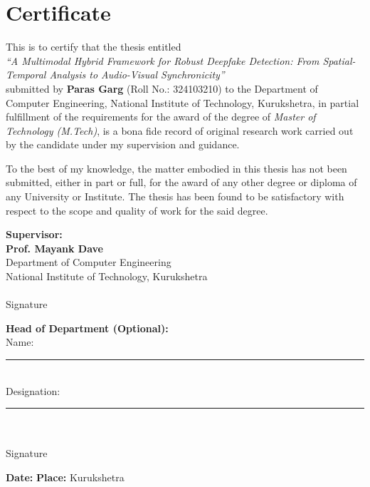 \chapter*{Certificate}
\thispagestyle{empty}
This is to certify that the thesis entitled\\
\textit{``A Multimodal Hybrid Framework for Robust Deepfake Detection: From Spatial-Temporal Analysis to Audio-Visual Synchronicity''}\\
submitted by \textbf{Paras Garg} (Roll No.: 324103210) to the Department of Computer Engineering, National Institute of Technology, Kurukshetra, in partial fulfillment of the requirements for the award of the degree of \textit{Master of Technology (M.Tech)}, is a bona fide record of original research work carried out by the candidate under my supervision and guidance.

To the best of my knowledge, the matter embodied in this thesis has not been submitted, either in part or full, for the award of any other degree or diploma of any University or Institute. The thesis has been found to be satisfactory with respect to the scope and quality of work for the said degree.

\vspace{1.5cm}
\noindent
\begin{minipage}[t]{0.45\textwidth}
\textbf{Supervisor:}\\[0.8cm]
\textbf{Prof. Mayank Dave}\\
Department of Computer Engineering\\
National Institute of Technology, Kurukshetra\\[1.2cm]
\makebox[0.9\linewidth]{\hrulefill}\\
Signature
\end{minipage}
\hfill
\begin{minipage}[t]{0.45\textwidth}
\textbf{Head of Department (Optional):}\\[0.8cm]
Name: \rule{5cm}{0.2pt}\\
Designation: \rule{4.5cm}{0.2pt}\\[1.2cm]
\makebox[0.9\linewidth]{\hrulefill}\\
Signature
\end{minipage}

\vspace{1.5cm}
\noindent\textbf{Date:} \hspace{4cm} \textbf{Place:} Kurukshetra

\clearpage
